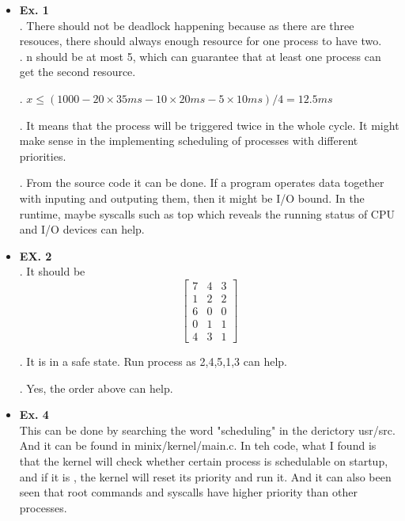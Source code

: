 \documentclass{article}
\begin{document}
\begin{itemize}
\item {\bf Ex. 1}\\
{. There should not be deadlock happening because as there are three resouces, there should always enough resource for one process to have two.}\\ 

{. n should be at most 5, which can guarantee that at least one process can get the second resource.\\}

{. $x\leq (1000-20\times 35ms-10\times 20ms-5\times 10ms)/4 = 12.5ms$\\}

{. It means that the process will be triggered twice in the whole cycle. It might make sense in the implementing scheduling of processes with different priorities.\\}

{. From the source code it can be done. If a program operates data together with inputing and outputing them, then it might be I/O bound. In the runtime, maybe syscalls such as top which reveals the running status of CPU and I/O devices can help.\\}




\item {\bf EX. 2}\\

{. It should be $$\left[\begin{matrix}7&4&3\\1&2&2\\6&0&0\\0&1&1\\4&3&1\end{matrix}\right]$$}

{. It is in a safe state. Run process as 2,4,5,1,3 can help.\\}

{. Yes, the order above can help.}\\

\item {\bf Ex. 4}\\
This can be done by searching the word "scheduling" in the derictory usr/src. And it can be found in minix/kernel/main.c. In teh code, what I found is that the kernel will check whether certain process is schedulable on startup, and if it is , the kernel will reset its priority and run it. And it can also been seen that root commands and syscalls have higher priority than other processes.


\end{itemize}
\end{document}
